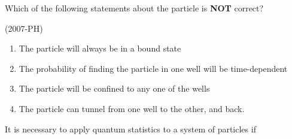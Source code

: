     Which of the following statements about the particle is \textbf{NOT} correct?

    \hfill (2007-PH)
    \begin{enumerate}
            \item The particle will always be in a bound state  
            \item The probability of finding the particle in one well will be time-dependent
            \item The particle will be confined to any one of the wells 
            \item The particle can tunnel from one well to the other, and back.
    \end{enumerate}
    \item It is necessary to apply quantum statistics to a system of particles if

